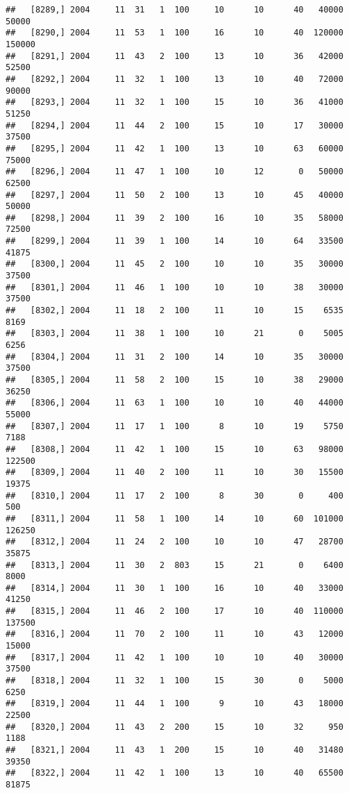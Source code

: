 \documentclass{article}\usepackage[]{graphicx}\usepackage[]{color}
\makeatletter
\newenvironment{kframe}{%
 \def\at@end@of@kframe{}%
 \ifinner\ifhmode%
  \def\at@end@of@kframe{\end{minipage}}%
  \begin{minipage}{\columnwidth}%
 \fi\fi%
 \def\FrameCommand##1{\hskip\@totalleftmargin \hskip-\fboxsep
 \colorbox{shadecolor}{##1}\hskip-\fboxsep
     \hskip-\linewidth \hskip-\@totalleftmargin \hskip\columnwidth}%
 \MakeFramed {\advance\hsize-\width
   \@totalleftmargin\z@ \linewidth\hsize
   \@setminipage}}%
 {\par\unskip\endMakeFramed%
 \at@end@of@kframe}
\newenvironment{knitrout}{}{} %
\makeatother
\begin{document}
\begin{knitrout}
\begin{kframe}
\begin{verbatim}
##   [8289,] 2004     11  31   1  100     10      10      40   40000   50000
##   [8290,] 2004     11  53   1  100     16      10      40  120000  150000
##   [8291,] 2004     11  43   2  100     13      10      36   42000   52500
##   [8292,] 2004     11  32   1  100     13      10      40   72000   90000
##   [8293,] 2004     11  32   1  100     15      10      36   41000   51250
##   [8294,] 2004     11  44   2  100     15      10      17   30000   37500
##   [8295,] 2004     11  42   1  100     13      10      63   60000   75000
##   [8296,] 2004     11  47   1  100     10      12       0   50000   62500
##   [8297,] 2004     11  50   2  100     13      10      45   40000   50000
##   [8298,] 2004     11  39   2  100     16      10      35   58000   72500
##   [8299,] 2004     11  39   1  100     14      10      64   33500   41875
##   [8300,] 2004     11  45   2  100     10      10      35   30000   37500
##   [8301,] 2004     11  46   1  100     10      10      38   30000   37500
##   [8302,] 2004     11  18   2  100     11      10      15    6535    8169
##   [8303,] 2004     11  38   1  100     10      21       0    5005    6256
##   [8304,] 2004     11  31   2  100     14      10      35   30000   37500
##   [8305,] 2004     11  58   2  100     15      10      38   29000   36250
##   [8306,] 2004     11  63   1  100     10      10      40   44000   55000
##   [8307,] 2004     11  17   1  100      8      10      19    5750    7188
##   [8308,] 2004     11  42   1  100     15      10      63   98000  122500
##   [8309,] 2004     11  40   2  100     11      10      30   15500   19375
##   [8310,] 2004     11  17   2  100      8      30       0     400     500
##   [8311,] 2004     11  58   1  100     14      10      60  101000  126250
##   [8312,] 2004     11  24   2  100     10      10      47   28700   35875
##   [8313,] 2004     11  30   2  803     15      21       0    6400    8000
##   [8314,] 2004     11  30   1  100     16      10      40   33000   41250
##   [8315,] 2004     11  46   2  100     17      10      40  110000  137500
##   [8316,] 2004     11  70   2  100     11      10      43   12000   15000
##   [8317,] 2004     11  42   1  100     10      10      40   30000   37500
##   [8318,] 2004     11  32   1  100     15      30       0    5000    6250
##   [8319,] 2004     11  44   1  100      9      10      43   18000   22500
##   [8320,] 2004     11  43   2  200     15      10      32     950    1188
##   [8321,] 2004     11  43   1  200     15      10      40   31480   39350
##   [8322,] 2004     11  42   1  100     13      10      40   65500   81875

\end{verbatim}
\end{kframe}
\end{knitrout}
\end{document}
